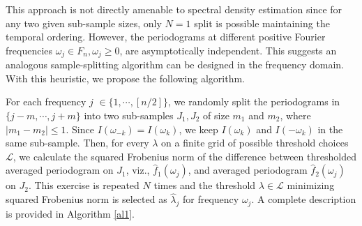 This approach is not directly amenable to spectral density estimation since for any two given sub-sample sizes, only $N=1$ split is possible maintaining the temporal ordering. However, the periodograms at different positive Fourier frequencies $\omega_j \in F_n, \omega_j \ge 0$, are asymptotically independent. This suggests an analogous sample-splitting algorithm can be designed in the frequency domain. With this heuristic, we propose the following algorithm.

For each frequency $j$ $\in \{1, \cdots, [n/2]\}$, we randomly split the periodograms in $\{j-m ,\cdots,j+m\}$ into two sub-samples $J_1, J_2$ of size $m_1$ and $m_2$, where $|m_1 - m_2 | \le 1$. Since $I(\omega_{-k}) = I(\omega_{k})$, we keep $I(\omega_k)$ and $I(-\omega_k)$ in the same sub-sample. Then, for every $\lambda$ on a finite grid of possible threshold choices $\mathcal{L}$, we calculate the squared Frobenius norm of the difference between thresholded averaged periodogram on $J_1$, viz.,  $\hat{f}_{1}(\omega_j)$,  and averaged periodogram $\hat{f}_{2}(\omega_j)$ on $J_2$. This exercise is repeated $N$ times and the threshold $\lambda \in \mathcal{L}$ minimizing squared Frobenius norm is selected as $\hat{\lambda}_j$ for frequency $\omega_j$. A complete description is provided in Algorithm \ref{al1}.






